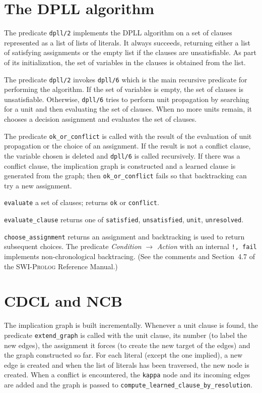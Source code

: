 \documentclass[11pt]{report}
\newcommand*{\p}[1]{\textup{\texttt{#1}}}
\newcommand*{\sw}{\textsc{SWI-Prolog}}
\begin{document}
\newpage

\section{The DPLL algorithm}

The predicate \p{dpll/2} implements the DPLL algorithm on a set of clauses
represented as a list of lists of literals. It always succeeds,
returning either a list of satisfying assignments or the empty list if
the clauses are unsatisfiable. As part of its initialization, the set of
variables in the clauses is obtained from the list. 

The predicate \p{dpll/2} invokes \p{dpll/6} which is the main recursive
predicate for performing the algorithm. If the set of variables is
empty, the set of clauses is unsatisfiable. Otherwise, \p{dpll/6} tries
to perform unit propagation by searching for a unit and then evaluating
the set of clauses. When no more units remain, it chooses a decision
assignment and evaluates the set of clauses.

The predicate \p{ok\_or\_conflict} is called with the result of the
evaluation of unit propagation or the choice of an assignment. If the
result is not a conflict clause, the variable chosen is deleted and
\p{dpll/6} is called recursively. If there was a conflict clause, the
implication graph is constructed and a learned clause is generated from
the graph; then \p{ok\_or\_conflict} fails so that backtracking can try
a new assignment.

\p{evaluate} a set of clauses; returns \p{ok} or \p{conflict}.

\p{evaluate\_clause} returns one of \p{satisfied}, \p{unsatisfied},
\p{unit}, \p{unresolved}.

\p{choose\_assignment} returns an assignment and backtracking is used to
return subsequent choices. The predicate \emph{Condition} $\rightarrow$
\emph{Action} with an internal \p{!, fail} implements non-chronological
backtracing. (See the comments and Section~4.7 of the \sw{} Reference
Manual.)


\section{CDCL and NCB}

The implication graph is built incrementally. Whenever a unit clause is
found, the predicate \p{extend\_graph} is called with the unit clause,
its number (to label the new edges), the assignment it forces (to create
the new target of the edges) and the graph constructed so far. For each
literal (except the one implied), a new edge is created and when the
list of literals has been traversed, the new node is created. When a
conflict is encountered, the \p{kappa} node and its incoming edges are
added and the graph is passed to \p{compute\_learned\_clause\_by\_resolution}.
\end{document}
